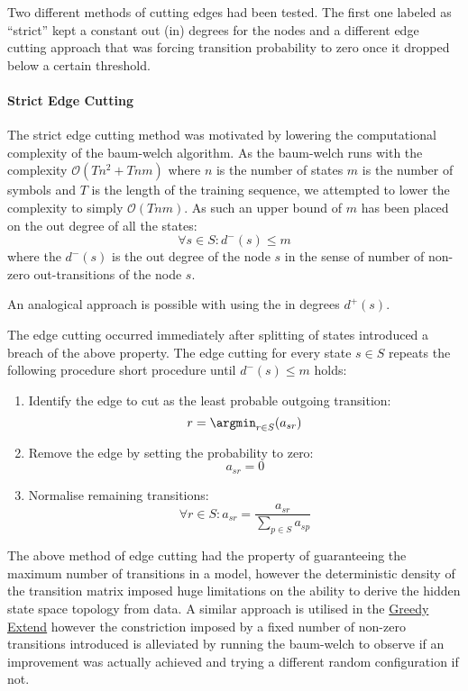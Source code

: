 Two different methods of cutting edges had been tested. The first one labeled as ``strict'' kept a constant out (in) degrees for the nodes and a different edge cutting approach that was forcing transition probability to zero once it dropped below a certain threshold.

\paragraph {Strict Edge Cutting}
The strict edge cutting method was motivated by lowering the computational complexity of the \gls{baum-welch} algorithm. As the \gls{baum-welch} runs with the complexity $\mathcal{O}(Tn^2+Tnm)$ where $n$ is the number of states $m$ is the number of symbols and $T$ is the length of the training sequence, we attempted to lower the complexity to simply $\mathcal{O}(Tnm)$. As such an upper bound of $m$ has been placed on the out degree of all the states: $$\forall s\in S: d^-(s) \le m$$ where the $d^-(s)$ is the out degree of the node $s$ in the sense of number of non-zero out-transitions of the node $s$.

An analogical approach is possible with using the in degrees $d^+(s)$.

The edge cutting occurred immediately after splitting of states introduced a breach of the above property. The edge cutting for every state $s\in S$ repeats the following procedure short procedure until $d^-(s) \le m$ holds:
\begin{enumerate}
	\item Identify the edge to cut as the least probable outgoing transition:
	$$r = \argmin_{r\in S}(a_{sr})$$
	\item Remove the edge by setting the probability to zero: $$a_{sr} = 0$$
	\item Normalise remaining transitions:
	$$\forall r \in S: a_{sr} = \frac{a_{sr}}{\sum_{p\in S}a_{sp}}$$
\end{enumerate}

The above method of edge cutting had the property of guaranteeing the maximum number of transitions in a model, however the deterministic density of the transition matrix imposed huge limitations on the ability to derive the hidden state space topology from data. A similar approach is utilised in the \hyperref[sec:greedy_extend]{Greedy Extend} however the constriction imposed by a fixed number of non-zero transitions introduced is alleviated by running the \gls{baum-welch} to observe if an improvement was actually achieved and trying a different random configuration if not.

